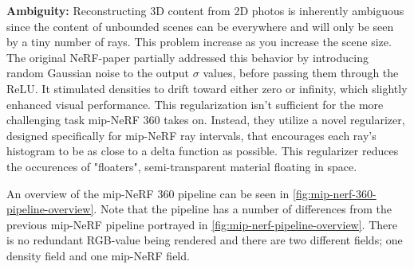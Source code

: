 \textbf{Ambiguity:}
Reconstructing 3D content from 2D photos is inherently ambiguous since the content of unbounded scenes can be everywhere and will only be seen by a tiny number of rays. This problem increase as you increase the scene size. The original NeRF-paper partially addressed this behavior by introducing random Gaussian noise to the output $\sigma$ values, before passing them through the ReLU. It stimulated densities to drift toward either zero or infinity, which slightly enhanced visual performance. This regularization isn't sufficient for the more challenging task mip-NeRF 360 takes on. Instead, they utilize a novel regularizer, designed specifically for mip-NeRF ray intervals, that encourages each ray's histogram to be as close to a delta function as possible. This regularizer reduces the occurences of "floaters", semi-transparent material floating in space.



An overview of the mip-NeRF 360 pipeline can be seen in \autoref{fig:mip-nerf-360-pipeline-overview}. Note that the pipeline has a number of differences from the previous mip-NeRF pipeline portrayed in \autoref{fig:mip-nerf-pipeline-overview}. There is no redundant RGB-value being rendered and there are two different fields; one density field and one mip-NeRF field.


\begin{comment}
\section{Large Scale NeRF} \label{sec:large-scale-nerf}
\subsection{Block NerF}
\subsection{Wayve - Nvidia GTC talk}
\end{comment}

